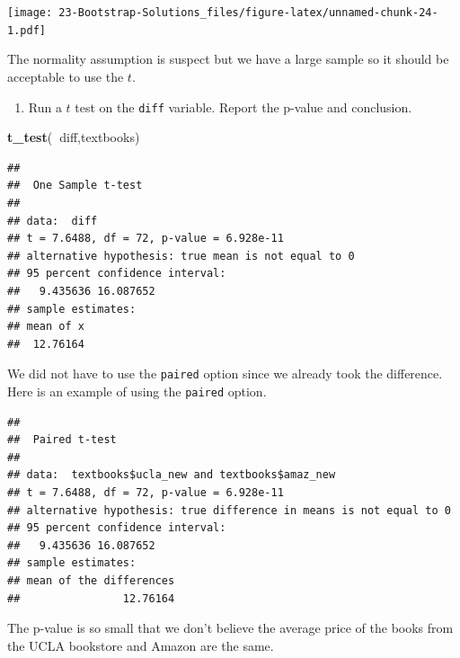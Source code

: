 \documentclass[
]{book}
\newenvironment{Shaded}{\begin{snugshade}}{\end{snugshade}}
\newcommand{\DataTypeTok}[1]{\textcolor[rgb]{0.13,0.29,0.53}{#1}}
\newcommand{\KeywordTok}[1]{\textcolor[rgb]{0.13,0.29,0.53}{\textbf{#1}}}
\newcommand{\NormalTok}[1]{#1}
\newcommand{\OperatorTok}[1]{\textcolor[rgb]{0.81,0.36,0.00}{\textbf{#1}}}
\newcommand{\OtherTok}[1]{\textcolor[rgb]{0.56,0.35,0.01}{#1}}
\providecommand{\tightlist}{%
  \setlength{\itemsep}{0pt}\setlength{\parskip}{0pt}}
\begin{document}
\texttt{[image: 23-Bootstrap-Solutions\_files/figure-latex/unnamed-chunk-24-1.pdf]}

The normality assumption is suspect but we have a large sample so it should be acceptable to use the \(t\).

\begin{enumerate}
\def\labelenumi{\alph{enumi}.}
\setcounter{enumi}{4}
\tightlist
\item
  Run a \(t\) test on the \texttt{diff} variable. Report the p-value and conclusion.
\end{enumerate}

\begin{Shaded}
\begin{Highlighting}[]
\KeywordTok{t_test}\NormalTok{(}\OperatorTok{~}\NormalTok{diff,textbooks)}
\end{Highlighting}
\end{Shaded}

\begin{verbatim}
## 
##  One Sample t-test
## 
## data:  diff
## t = 7.6488, df = 72, p-value = 6.928e-11
## alternative hypothesis: true mean is not equal to 0
## 95 percent confidence interval:
##   9.435636 16.087652
## sample estimates:
## mean of x 
##  12.76164
\end{verbatim}

We did not have to use the \texttt{paired} option since we already took the difference. Here is an example of using the \texttt{paired} option.

\begin{Shaded}
\end{Shaded}

\begin{verbatim}
## 
##  Paired t-test
## 
## data:  textbooks$ucla_new and textbooks$amaz_new
## t = 7.6488, df = 72, p-value = 6.928e-11
## alternative hypothesis: true difference in means is not equal to 0
## 95 percent confidence interval:
##   9.435636 16.087652
## sample estimates:
## mean of the differences 
##                12.76164
\end{verbatim}

The p-value is so small that we don't believe the average price of the books from the UCLA bookstore and Amazon are the same.
\end{document}
